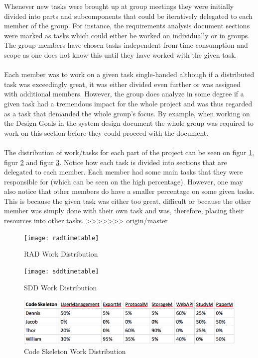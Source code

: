 Whenever new tasks were brought up at group meetings they were initially divided into parts and subcomponents that could be iteratively delegated to each member of the group. For instance, the requirements analysis document sections were marked as tasks which could either be worked on individually or in groups. The group members have chosen tasks independent from time consumption and scope as one does not know this until they have worked with the given task.\\\\ Each member was to work on a given task single-handed although if a distributed task was exceedingly great, it was either divided even further or was assigned with additional members. However, the group does analyze in some degree if a given task had a tremendous impact  for the whole project and was thus regarded as a task that demanded the whole group's focus. By example, when working on the Design Goals in the system design document the whole group was required to work on this section before they could proceed with the document. \\\\The distribution of work/tasks for each part of the project can be seen on figur \ref{fig:rad}, figur \ref{fig:sdd} and figur \ref{fig:codeskeleton}. Notice how each task is divided into sections that are delegated to each member. Each member had some main tasks that they were responsible for (which can be seen on the high percentage). However, one may also notice that other members do have a smaller percentage on some given tasks. This is because the given task was either too great, difficult or because the other member was simply done with their own task and was, therefore, placing their resources into other tasks.
>>>>>>> origin/master


\begin{figure}[H]
	\centering
	\texttt{[image: radtimetable]}
	\caption{RAD Work Distribution}
	\label{fig:rad}
\end{figure}

\begin{figure}[H]
	\centering
	\texttt{[image: sddtimetable]}
	\caption{SDD Work Distribution}
	\label{fig:sdd}
\end{figure}

\begin{figure}[H]
	\centering
	\includegraphics[width=150mm]{image/skeletontimetable}
	\caption{Code Skeleton Work Distribution}
	\label{fig:codeskeleton} %
\end{figure}
